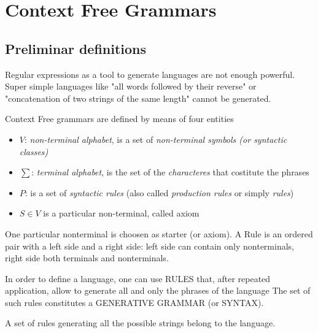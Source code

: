 \chapter{Context Free Grammars}
	\section{Preliminar definitions}
		Regular expressions as a tool to generate languages are not enough powerful. 
		Super simple languages like "all words followed by their reverse" or "concatenation of two strings of the same length" cannot be generated.

		Context Free grammars are defined by means of four entities
		\begin{itemize}
			\item $V$: \emph{non-terminal alphabet}, is a set of \emph{non-terminal symbols (or syntactic classes)}
			\item $\sum$: \emph{terminal alphabet}, is the set of the \emph{characteres} that costitute the phrases
			\item $P$: is a set of \emph{syntactic rules} (also called \emph{production rules} or simply \emph{rules})
			\item $S \in V$ is a particular non-terminal, called axiom
		\end{itemize}
		One particular nonterminal is choosen as starter (or axiom).
		A Rule is an ordered pair with a left side and a right side: left side can contain only nonterminals, right side both terminals and nonterminals. 
		
		In order to define a language, one can use RULES that, after repeated application, allow to generate all and only the phrases of the language
		The set of such rules constitutes a GENERATIVE GRAMMAR (or SYNTAX).

		\begin{definition}
			A set of rules generating all the possible strings belong to the language.
		\end{definition}


